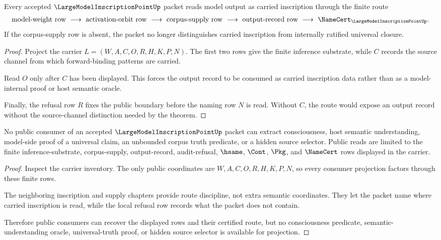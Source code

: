 \begin{theorem}
\label{thm:largemodelinscriptionpoint-carried-output-boundary}
Every accepted $\LargeModelInscriptionPointUp$ packet reads model output as carried inscription through the finite route
$$
\begin{gathered}
\text{model-weight row}\ \longrightarrow\ \text{activation-orbit row}\ \longrightarrow\ \text{corpus-supply row}\ \longrightarrow\ \text{output-record row}\ \longrightarrow\ \NameCert_{\LargeModelInscriptionPointUp}.
\end{gathered}
$$
If the corpus-supply row is absent, the packet no longer distinguishes carried inscription from internally ratified universal closure.
\end{theorem}
\begin{proof}
Project the carrier $L=(W,A,C,O,R,H,K,P,N)$. The first two rows give the finite inference substrate, while $C$ records the source channel from which forward-binding patterns are carried.

Read $O$ only after $C$ has been displayed. This forces the output record to be consumed as carried inscription data rather than as a model-internal proof or host semantic oracle.

Finally, the refusal row $R$ fixes the public boundary before the naming row $N$ is read. Without $C$, the route would expose an output record without the source-channel distinction needed by the theorem.
\end{proof}

\begin{theorem}
\label{thm:largemodelinscriptionpoint-public-nonescape}
No public consumer of an accepted $\LargeModelInscriptionPointUp$ packet can extract consciousness, host semantic understanding, model-side proof of a universal claim, an unbounded corpus truth predicate, or a hidden source selector. Public reads are limited to the finite inference-substrate, corpus-supply, output-record, audit-refusal, $\hsame$, $\Cont$, $\Pkg$, and $\NameCert$ rows displayed in the carrier.
\end{theorem}
\begin{proof}
Inspect the carrier inventory. The only public coordinates are $W,A,C,O,R,H,K,P,N$, so every consumer projection factors through these finite rows.

The neighboring inscription and supply chapters provide route discipline, not extra semantic coordinates. They let the packet name where carried inscription is read, while the local refusal row records what the packet does not contain.

Therefore public consumers can recover the displayed rows and their certified route, but no consciousness predicate, semantic-understanding oracle, universal-truth proof, or hidden source selector is available for projection.
\end{proof}

